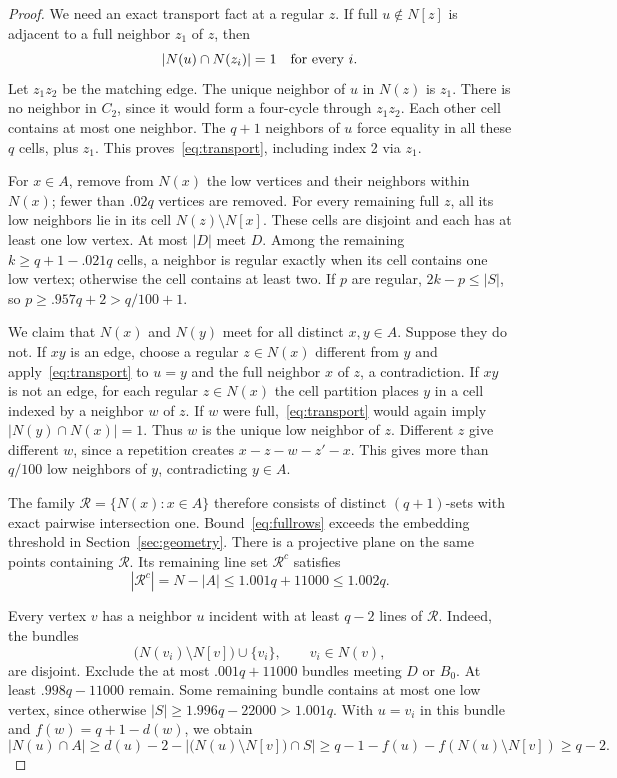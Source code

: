 \documentclass[11pt]{article}
\theoremstyle{remark}\newtheorem*{remark}{Remark}
\begin{document}
\begin{proof}
We need an exact transport fact at a regular $z$. If full $u\notin N[z]$ is adjacent to a full neighbor $z_1$ of $z$, then
\begin{equation}\label{eq:transport}
 |N(u)\cap N(z_i)|=1\quad\hbox{for every }i.
\end{equation}
Let $z_1z_2$ be the matching edge. The unique neighbor of $u$ in $N(z)$ is $z_1$. There is no neighbor in $C_2$, since it would form a four-cycle through $z_1z_2$. Each other cell contains at most one neighbor. The $q+1$ neighbors of $u$ force equality in all these $q$ cells, plus $z_1$. This proves~\eqref{eq:transport}, including index 2 via $z_1$.

For $x\in A$, remove from $N(x)$ the low vertices and their neighbors within $N(x)$; fewer than $.02q$ vertices are removed. For every remaining full $z$, all its low neighbors lie in its cell $N(z)\setminus N[x]$. These cells are disjoint and each has at least one low vertex. At most $|D|$ meet $D$. Among the remaining $k\geq q+1-.021q$ cells, a neighbor is regular exactly when its cell contains one low vertex; otherwise the cell contains at least two. If $p$ are regular, $2k-p\leq|S|$, so $p\geq.957q+2>q/100+1$.

We claim that $N(x)$ and $N(y)$ meet for all distinct $x,y\in A$. Suppose they do not. If $xy$ is an edge, choose a regular $z\in N(x)$ different from $y$ and apply~\eqref{eq:transport} to $u=y$ and the full neighbor $x$ of $z$, a contradiction. If $xy$ is not an edge, for each regular $z\in N(x)$ the cell partition places $y$ in a cell indexed by a neighbor $w$ of $z$. If $w$ were full,~\eqref{eq:transport} would again imply $|N(y)\cap N(x)|=1$. Thus $w$ is the unique low neighbor of $z$. Different $z$ give different $w$, since a repetition creates $x-z-w-z'-x$. This gives more than $q/100$ low neighbors of $y$, contradicting $y\in A$.

The family $\mathcal R=\{N(x):x\in A\}$ therefore consists of distinct $(q+1)$-sets with exact pairwise intersection one. Bound~\eqref{eq:fullrows} exceeds the embedding threshold in Section~\ref{sec:geometry}. There is a projective plane on the same points containing $\mathcal R$. Its remaining line set $\mathcal R^c$ satisfies
\begin{equation}\label{eq:remaining}
 |\mathcal R^c|=N-|A|\leq1.001q+11000\leq1.002q.
\end{equation}

Every vertex $v$ has a neighbor $u$ incident with at least $q-2$ lines of $\mathcal R$. Indeed, the bundles
\[
 \bigl(N(v_i)\setminus N[v]\bigr)\cup\{v_i\},\qquad v_i\in N(v),
\]
are disjoint. Exclude the at most $.001q+11000$ bundles meeting $D$ or $B_0$. At least $.998q-11000$ remain. Some remaining bundle contains at most one low vertex, since otherwise $|S|\geq1.996q-22000>1.001q$. With $u=v_i$ in this bundle and $f(w)=q+1-d(w)$, we obtain
\[
 |N(u)\cap A|\geq d(u)-2-|\bigl(N(u)\setminus N[v]\bigr)\cap S|
 \geq q-1-f(u)-f(N(u)\setminus N[v])\geq q-2.
\]


\end{proof}
\end{document}
